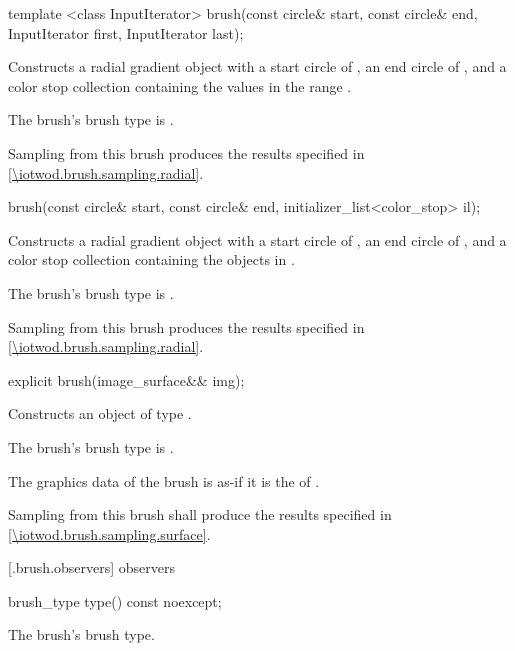 %
\begin{itemdecl}
template <class InputIterator>
brush(const circle& start, const circle& end,
  InputIterator first, InputIterator last);
\end{itemdecl}
\begin{itemdescr}
\pnum
\effects
Constructs a radial gradient  object with a start circle of , an end circle of , and a color stop collection containing the values in the range .

\pnum
The brush's brush type is .

\pnum
\remarks
Sampling from this brush produces the results specified in \ref{\iotwod.brush.sampling.radial}.
\end{itemdescr}

%
\begin{itemdecl}
brush(const circle& start, const circle& end,
  initializer_list<color_stop> il);
\end{itemdecl}
\begin{itemdescr}
\pnum
\effects
Constructs a radial gradient  object with a start circle of , an end circle of , and a color stop collection containing the  objects in .

\pnum
The brush's brush type is .

\pnum
\remarks
Sampling from this brush produces the results specified in \ref{\iotwod.brush.sampling.radial}.
\end{itemdescr}

%
\begin{itemdecl}
explicit brush(image_surface&& img);
\end{itemdecl}
\begin{itemdescr}
\pnum
\pnum
\effects
Constructs an object of type .

\pnum
The brush's brush type is .

\pnum
The graphics data of the brush is as-if it is the \underlyingimagesurface of .

\pnum
\remarks
Sampling from this brush shall produce the results specified in \ref{\iotwod.brush.sampling.surface}.
\end{itemdescr}

 [\iotwod.brush.observers]{ observers}

%
\begin{itemdecl}
brush_type type() const noexcept;
\end{itemdecl}
\begin{itemdescr}
\pnum
\returns
The brush's brush type.
\end{itemdescr}
